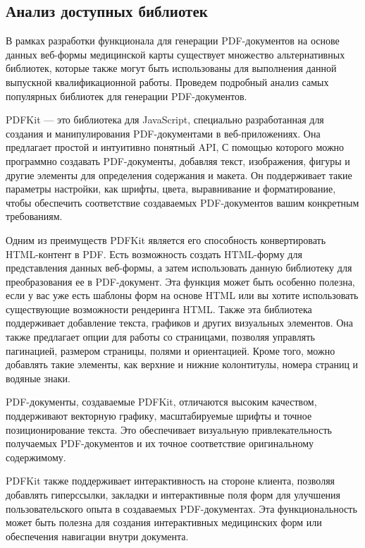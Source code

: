 \subsection{Анализ доступных библиотек}

В рамках разработки функционала для генерации PDF-документов на основе данных веб-формы медицинской карты существует множество альтернативных библиотек, которые также могут быть использованы для выполнения данной выпускной квалификационной работы. Проведем подробный анализ самых популярных библиотек для генерации PDF-документов.

PDFKit — это библиотека для JavaScript, специально разработанная для создания и манипулирования PDF-документами в веб-приложениях. Она предлагает простой и интуитивно понятный API, С помощью которого можно программно создавать PDF-документы, добавляя текст, изображения, фигуры и другие элементы для определения содержания и макета. Он поддерживает такие параметры настройки, как шрифты, цвета, выравнивание и форматирование, чтобы обеспечить соответствие создаваемых PDF-документов вашим конкретным требованиям.

Одним из преимуществ PDFKit является его способность конвертировать HTML-контент в PDF. Есть возможность создать HTML-форму для представления данных веб-формы, а затем использовать данную библиотеку для преобразования ее в PDF-документ. Эта функция может быть особенно полезна, если у вас уже есть шаблоны форм на основе HTML или вы хотите использовать существующие возможности рендеринга HTML. Также эта библиотека поддерживает добавление текста, графиков и других визуальных элементов. Она также предлагает опции для работы со страницами, позволяя управлять пагинацией, размером страницы, полями и ориентацией. Кроме того, можно добавлять такие элементы, как верхние и нижние колонтитулы, номера страниц и водяные знаки.

PDF-документы, создаваемые PDFKit, отличаются высоким качеством, поддерживают векторную графику, масштабируемые шрифты и точное позиционирование текста. Это обеспечивает визуальную привлекательность получаемых PDF-документов и их точное соответствие оригинальному содержимому.

PDFKit также поддерживает интерактивность на стороне клиента, позволяя добавлять гиперссылки, закладки и интерактивные поля форм для улучшения пользовательского опыта в создаваемых PDF-документах. Эта функциональность может быть полезна для создания интерактивных медицинских форм или обеспечения навигации внутри документа.

